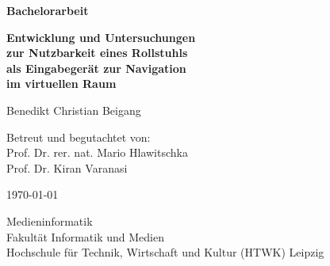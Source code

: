\begin{titlepage}
    \begin{center}
        \vspace*{1cm}

        \textbf{\Huge{Bachelorarbeit}}

        \vspace{0.5cm}

        \textbf{\huge
            {
                Entwicklung und Untersuchungen\\
                zur Nutzbarkeit eines Rollstuhls\\
                als Eingabegerät zur Navigation\\
                im virtuellen Raum\\
            }}

        \vspace{1.5cm}

        \LARGE{Benedikt Christian Beigang}

        \vfill

        \large
        {
            Betreut und begutachtet von:\\
            Prof. Dr. rer. nat. Mario Hlawitschka\\
            Prof. Dr. Kiran Varanasi
        }

        \vspace{2.5cm}

        \today

        \vspace{0.5cm}

        \large{
            Medieninformatik\\
            Fakultät Informatik und Medien\\
            Hochschule für Technik, Wirtschaft und Kultur (HTWK) Leipzig
        }

    \end{center}
\end{titlepage}
